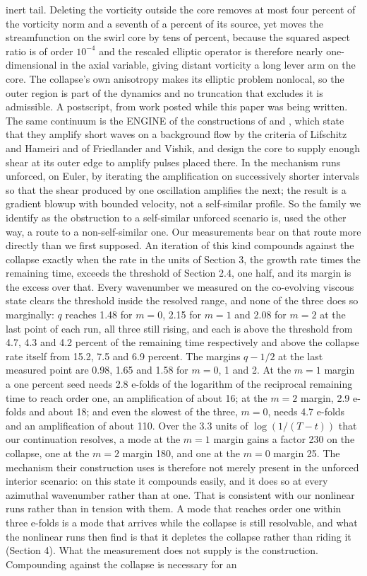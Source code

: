 \documentclass[11pt]{article}
\begin{document}
inert tail. Deleting the vorticity outside the core removes at most four percent of the vorticity norm and a seventh of a percent of its source, yet moves the streamfunction on the swirl core by tens of percent, because the squared aspect ratio is of order $10^{-4}$ and the rescaled elliptic operator is therefore nearly one-dimensional in the axial variable, giving distant vorticity a long lever arm on the core. The collapse's own anisotropy makes its elliptic problem nonlocal, so the outer region is part of the dynamics and no truncation that excludes it is admissible. A postscript, from work posted while this paper was being written. The same continuum is the ENGINE of the constructions of \cite{OAI26a} and \cite{OAI26b}, which state that they amplify short waves on a background flow by the criteria of Lifschitz and Hameiri and of Friedlander and Vishik, and design the core to supply enough shear at its outer edge to amplify pulses placed there. In \cite{OAI26b} the mechanism runs unforced, on Euler, by iterating the amplification on successively shorter intervals so that the shear produced by one oscillation amplifies the next; the result is a gradient blowup with bounded velocity, not a self-similar profile. So the family we identify as the obstruction to a self-similar unforced scenario is, used the other way, a route to a non-self-similar one. Our measurements bear on that route more directly than we first supposed. An iteration of this kind compounds against the collapse exactly when the rate in the units of Section 3, the growth rate times the remaining time, exceeds the threshold of Section 2.4, one half, and its margin is the excess over that. Every wavenumber we measured on the co-evolving viscous state clears the threshold inside the resolved range, and none of the three does so marginally: $q$ reaches 1.48 for $m = 0$, 2.15 for $m = 1$ and 2.08 for $m = 2$ at the last point of each run, all three still rising, and each is above the threshold from 4.7, 4.3 and 4.2 percent of the remaining time respectively and above the collapse rate itself from 15.2, 7.5 and 6.9 percent. The margins $q - 1/2$ at the last measured point are 0.98, 1.65 and 1.58 for $m = 0$, 1 and 2. At the $m = 1$ margin a one percent seed needs 2.8 e-folds of the logarithm of the reciprocal remaining time to reach order one, an amplification of about 16; at the $m = 2$ margin, 2.9 e-folds and about 18; and even the slowest of the three, $m = 0$, needs 4.7 e-folds and an amplification of about 110. Over the 3.3 units of $\log(1/(T - t))$ that our continuation resolves, a mode at the $m = 1$ margin gains a factor 230 on the collapse, one at the $m = 2$ margin 180, and one at the $m = 0$ margin 25. The mechanism their construction uses is therefore not merely present in the unforced interior scenario: on this state it compounds easily, and it does so at every azimuthal wavenumber rather than at one. That is consistent with our nonlinear runs rather than in tension with them. A mode that reaches order one within three e-folds is a mode that arrives while the collapse is still resolvable, and what the nonlinear runs then find is that it depletes the collapse rather than riding it (Section 4). What the measurement does not supply is the construction. Compounding against the collapse is necessary for an 
\end{document}
